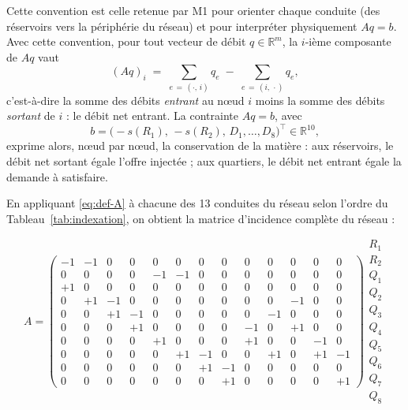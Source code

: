 \documentclass[11pt,a4paper]{article}
\theoremstyle{plain}
\theoremstyle{definition}
\theoremstyle{remark}
\begin{document}
Cette convention est celle retenue par M1 pour orienter chaque conduite
(des réservoirs vers la périphérie du réseau) et pour interpréter physiquement
$Aq = b$. Avec cette convention, pour tout vecteur de débit
$q \in \mathbb{R}^m$, la $i$-ième composante de $Aq$ vaut
\begin{equation}
(Aq)_i \;=\; \sum_{e \,=\, (\cdot,\, i)} q_e \;-\; \sum_{e \,=\, (i,\, \cdot)} q_e,
\label{eq:Aq-i}
\end{equation}
c'est-à-dire la somme des débits \emph{entrant} au nœud $i$ moins la somme
des débits \emph{sortant} de $i$ : le débit net entrant. La contrainte
$Aq = b$, avec
\[
b = \big(-s(R_1),\, -s(R_2),\, D_1, \dots, D_8\big)^\top \in \mathbb{R}^{10},
\]
exprime alors, nœud par nœud, la conservation de la matière : aux
réservoirs, le débit net sortant égale l'offre injectée ; aux quartiers, le
débit net entrant égale la demande à satisfaire.

En appliquant \eqref{eq:def-A} à chacune des 13 conduites du réseau selon
l'ordre du Tableau~\ref{tab:indexation}, on obtient la matrice d'incidence
complète du réseau :

\begin{equation}
A =
\begin{pmatrix}
-1 & -1 &  0 &  0 &  0 &  0 &  0 &  0 &  0 &  0 &  0 &  0 &  0 \\
 0 &  0 &  0 &  0 & -1 & -1 &  0 &  0 &  0 &  0 &  0 &  0 &  0 \\
+1 &  0 &  0 &  0 &  0 &  0 &  0 &  0 &  0 &  0 &  0 &  0 &  0 \\
 0 & +1 & -1 &  0 &  0 &  0 &  0 &  0 &  0 &  0 & -1 &  0 &  0 \\
 0 &  0 & +1 & -1 &  0 &  0 &  0 &  0 &  0 & -1 &  0 &  0 &  0 \\
 0 &  0 &  0 & +1 &  0 &  0 &  0 &  0 & -1 &  0 & +1 &  0 &  0 \\
 0 &  0 &  0 &  0 & +1 &  0 &  0 &  0 & +1 &  0 &  0 & -1 &  0 \\
 0 &  0 &  0 &  0 &  0 & +1 & -1 &  0 &  0 & +1 &  0 & +1 & -1 \\
 0 &  0 &  0 &  0 &  0 &  0 & +1 & -1 &  0 &  0 &  0 &  0 &  0 \\
 0 &  0 &  0 &  0 &  0 &  0 &  0 & +1 &  0 &  0 &  0 &  0 & +1
\end{pmatrix}
\begin{array}{l}
R_1 \\ R_2 \\ Q_1 \\ Q_2 \\ Q_3 \\ Q_4 \\ Q_5 \\ Q_6 \\ Q_7 \\ Q_8
\end{array}
\label{eq:matrice-A}
\end{equation}
\end{document}

